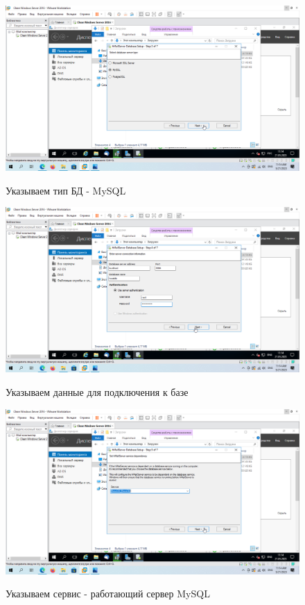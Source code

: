 \documentclass[a4paper]{article}
\begin{document}
  \begin{figure}[H]
    \centering
    \includegraphics[width=\textwidth]{11_0058}
    \label{img:58}
    \caption{Указываем тип БД - MySQL}
  \end{figure}

  \begin{figure}[H]
    \centering
    \includegraphics[width=\textwidth]{11_0059}
    \label{img:59}
    \caption{Указываем данные для подключения к базе}
  \end{figure}

  \begin{figure}[H]
    \centering
    \includegraphics[width=\textwidth]{11_0060}
    \label{img:60}
    \caption{Указываем сервис - работающий сервер MySQL}
  \end{figure}
\end{document}
